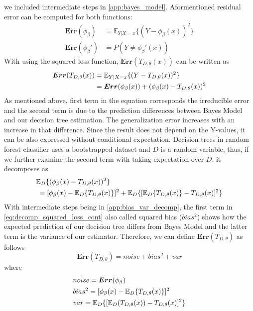 we included intermediate steps in \autoref{app:bayes_model}. 
Aformentioned residual error can be computed for both functions:
\begin{align}
\boldsymbol{Err}(\phi_{\beta}) & = \mathbb{E}_{Y|X=x}\{(Y-\phi_{\beta}(x))^2 \}\\
\boldsymbol{Err}(\phi_{\beta}') & = P(Y \neq \phi_{\beta}'(x) )
\end{align}
With using the squared loss function, $\boldsymbol{Err}(T_{D,\theta}(x))$ can be written as
\begin{align}\label{eq:decomp_squared_loss}
\boldsymbol{Err}(T_{D, \theta}(x)) & = \mathbb{E}_{Y|X=x}\{(Y-T_{D,\theta}(x))^2\} \notag \\
							   	  & = \boldsymbol{Err}(\phi_{\beta}(x)) + (\phi_{\beta}(x)-T_{D,\theta}(x))^2
\end{align}
As mentioned above, first term in the equation corresponds the 
irreducible error and the second term is due to the prediction differences between Bayes Model and our decision tree estimation. 
The generalization error increases with an increase in that difference. Since the result does not depend on the Y-values, 
it can be also expressed without conditional expectation. Decision trees in random forest classifier uses a bootstrapped dataset 
and $D$ is a random variable, thus, if we further examine the second term with taking expectation over $D$, it decomposes as
\begin{align}\label{eq:decomp_squared_loss_cont}
	& \mathbb{E}_{D}\{(\phi_{\beta}(x) - T_{D,\theta}(x))^2 \} \notag \\
	& \: = [\phi_{\beta}(x) - \mathbb{E}_{D}\{T_{D,\theta}(x)\}]^2 + 
	\mathbb{E}_{D}\{[\mathbb{E}_{D}\{T_{D,\theta}(x)\} - T_{D,\theta}(x)]^2\}
\end{align}
With intermediate steps being in \autoref{app:bias_var_decomp}, 
the first term in \autoref{eq:decomp_squared_loss_cont} also called squared bias ($bias^2$) shows how the expected prediction of our 
decision tree differs from Bayes Model and the latter term is the variance of our estimator. 
Therefore, we can define $\boldsymbol{Err}(T_{D,\theta})$ as follows
\begin{equation}
\boldsymbol{Err}(T_{D,\theta}) = noise + bias^2 + var
\end{equation}
\vspace{-3mm}
\qquad \qquad \qquad \quad where
\vspace{-6.3mm}
\begin{align}
& noise = \boldsymbol{Err}(\phi_{\beta}) \notag \\
& bias^2 = [\phi_{\beta}(x) - \mathbb{E}_{D}\{T_{D,\theta}(x)\}]^2 \notag \\
& var = \mathbb{E}_{D}\{[\mathbb{E}_{D}(T_{D,\theta}(x)) - T_{D,\theta}(x)]^2\} \notag
\end{align}
